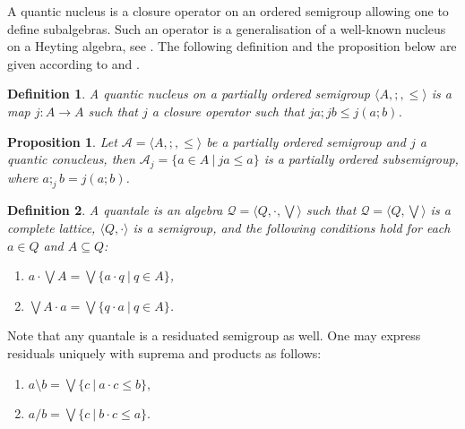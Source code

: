 \documentclass[a4paper]{article}
\theoremstyle{defin}
\newtheorem{defin}{Definition}
\theoremstyle{theorem}
\theoremstyle{prop}
\newtheorem{prop}{Proposition}
\theoremstyle{lemma}
\theoremstyle{ex}
\theoremstyle{col}
\theoremstyle{claim}
\begin{document}
A quantic nucleus is a closure operator on an ordered semigroup allowing one to define subalgebras. Such an operator is a generalisation of a well-known nucleus on a Heyting algebra, see \cite{bezhanishvili2016locales}. The following definition and the proposition below are given according to \cite{galatos2007residuated} and \cite{rosenthal1990quantales}.
\begin{defin}
  A quantic nucleus on a partially ordered semigroup $\langle A, ;, \leq \rangle$ is a map $j : A \to A$ such that $j$ a closure operator such that $j a ; j b \leq j (a ; b)$.
\end{defin}

\begin{prop} \label{subsemi}
  Let $\mathcal{A} = \langle A, ;, \leq \rangle$ be a partially ordered semigroup and $j$ a quantic conucleus, then
  $\mathcal{A}_j = \{ a \in A \: | \: j a \leq a \}$ is a partially ordered subsemigroup, where $a ;_j b = j(a ; b)$.
\end{prop}

\begin{defin}
  A quantale is an algebra $\mathcal{Q} = \langle Q, \cdot, \bigvee \rangle$ such that $\mathcal{Q} = \langle Q, \bigvee \rangle$ is a complete lattice, $\langle Q, \cdot \rangle$ is a semigroup, and the following conditions hold for each $a \in Q$ and $A \subseteq Q$:
  \begin{enumerate}
    \item $a \cdot \bigvee A = \bigvee \{ a \cdot q \: | \: q \in A \}$,
    \item $\bigvee A \cdot a = \bigvee \{ q \cdot a \: | \: q \in A \}$.
  \end{enumerate}
\end{defin}
Note that any quantale is a residuated semigroup as well. One may express residuals uniquely with suprema and products as follows:
\begin{enumerate}
  \item $a \setminus b = \bigvee \{ c \: | \: a \cdot c \leq b \}$,
  \item $a / b = \bigvee \{ c \: | \: b \cdot c \leq a \}$.
\end{enumerate}
\end{document}

